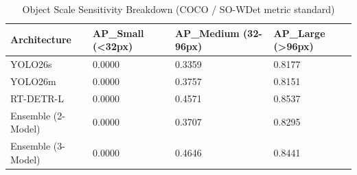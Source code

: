 \begin{table}
\caption{Object Scale Sensitivity Breakdown (COCO / SO-WDet metric standard)}
\label{tab:scale_sensitivity}
\begin{tabular}{llll}
\toprule
Architecture & AP_Small (<32px) & AP_Medium (32-96px) & AP_Large (>96px) \\
\midrule
YOLO26s & 0.0000 & 0.3359 & 0.8177 \\
YOLO26m & 0.0000 & 0.3757 & 0.8151 \\
RT-DETR-L & 0.0000 & 0.4571 & 0.8537 \\
Ensemble (2-Model) & 0.0000 & 0.3707 & 0.8295 \\
Ensemble (3-Model) & 0.0000 & 0.4646 & 0.8441 \\
\bottomrule
\end{tabular}
\end{table}
